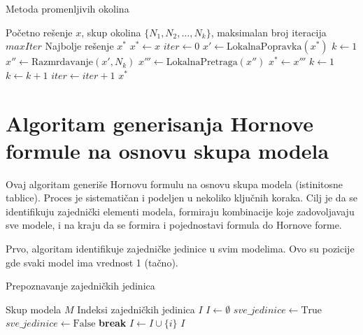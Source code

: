 \documentclass[12pt,oneside]{memoir}
\begin{document}
\begin{algorithm}[H]
\caption{Metoda promenljivih okolina}
\renewcommand{\algorithmicrequire}{\textbf{Ulaz:}}
\renewcommand{\algorithmicensure}{\textbf{Izlaz:}}
\begin{algorithmic}[1]
\REQUIRE Početno rešenje $x$, skup okolina $\{N_1, N_2, \ldots, N_k\}$, maksimalan broj iteracija $maxIter$
\ENSURE Najbolje rešenje $x^*$
\STATE $x^* \gets x$
\STATE $iter \gets 0$
    \STATE $x' \gets \text{LokalnaPopravka}(x^*)$ 
    \STATE $k \gets 1$
        \STATE $x'' \gets \text{Razmrdavanje}(x', N_k)$ 
        \STATE $x''' \gets \text{LokalnaPretraga}(x'')$ 
            \STATE $x^* \gets x'''$
            \STATE $k \gets 1$
        \ELSE
            \STATE $k \gets k + 1$
        \ENDIF
    \ENDWHILE
    \STATE $iter \gets iter + 1$
\ENDWHILE
\RETURN $x^*$
\end{algorithmic}
\end{algorithm}


\section{Algoritam generisanja Hornove formule na osnovu skupa modela}

Ovaj algoritam generiše Hornovu formulu na osnovu skupa modela (istinitosne tablice). Proces je sistematičan i podeljen u nekoliko ključnih koraka. Cilj je da se identifikuju zajednički elementi modela, formiraju kombinacije koje zadovoljavaju sve modele, i na kraju da se formira i pojednostavi formula do Hornove forme.

Prvo, algoritam identifikuje zajedničke jedinice u svim modelima. Ovo su pozicije gde svaki model ima vrednost 1 (tačno).

\begin{algorithm}[H]
\caption{Prepoznavanje zajedničkih jedinica}
\renewcommand{\algorithmicrequire}{\textbf{Ulaz:}}
\renewcommand{\algorithmicensure}{\textbf{Izlaz:}}
\begin{algorithmic}[1]
\REQUIRE Skup modela $M$
\ENSURE Indeksi zajedničkih jedinica $I$
\STATE $I \gets \emptyset$
    \STATE $sve\_jedinice \gets \text{True}$
            \STATE $sve\_jedinice \gets \text{False}$
            \STATE \textbf{break}
        \ENDIF
    \ENDFOR
        \STATE $I \gets I \cup \{ i \}$
    \ENDIF
\ENDFOR
\RETURN $I$
\end{algorithmic}
\end{algorithm}
\end{document}
